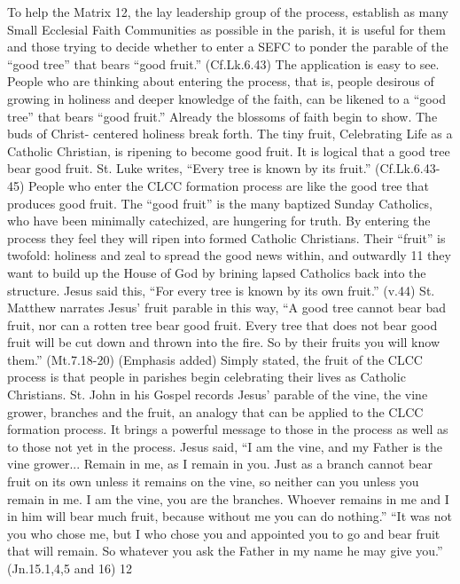 \documentclass{article}        %
\begin{document}
To help the Matrix 12, the lay leadership group of the process, establish as
many Small Ecclesial Faith Communities as possible in the parish, it is useful
for them and those trying to decide whether to enter a SEFC to ponder the
parable of the ``good tree'' that bears ``good fruit.'' (Cf.Lk.6.43) The
application is easy to see. People who are thinking about entering the process,
that is, people desirous of growing in holiness and deeper knowledge of the
faith, can be likened to a ``good tree'' that bears ``good fruit.'' Already the
blossoms of faith begin to show. The buds of Christ- centered holiness break
forth. The tiny fruit, Celebrating Life as a Catholic Christian, is ripening to
become good fruit.
It is logical that a good tree bear good fruit. St. Luke writes, ``Every tree is
known by its fruit.'' (Cf.Lk.6.43-45) People who enter the CLCC formation
process are like the good tree that produces good fruit. The ``good fruit'' is
the many baptized Sunday Catholics, who have been minimally catechized, are
hungering for truth. By entering the process they feel they will ripen into
formed Catholic Christians. Their ``fruit'' is twofold: holiness and zeal to
spread the good news within, and outwardly
11
they want to build up the House of God by brining lapsed Catholics back into the
structure. Jesus said this, ``For every tree is known by its own fruit.'' (v.44)
St. Matthew narrates Jesus' fruit parable in this way, ``A good tree cannot bear
bad fruit, nor can a rotten tree bear good fruit. Every tree that does not bear
good fruit will be cut down and thrown into the fire. So by their fruits you
will know them.'' (Mt.7.18-20) (Emphasis added) Simply stated, the fruit of the
CLCC process is that people in parishes begin celebrating their lives as
Catholic Christians.
St. John in his Gospel records Jesus' parable of the vine, the vine grower,
branches and the fruit, an analogy that can be applied to the CLCC formation
process. It brings a powerful message to those in the process as well as to
those not yet in the process.
Jesus said, ``I am the vine, and my Father is the vine grower... Remain in me,
as I remain in you. Just as a branch cannot bear fruit on its own unless it
remains on the vine, so neither can you unless you remain in me. I am the vine,
you are the branches. Whoever remains in me and I in him will bear much fruit,
because without me you can do nothing.''
``It was not you who chose me, but I who chose you and appointed you to go and
bear fruit that will remain. So whatever you ask the Father in my name he may
give you.'' (Jn.15.1,4,5 and 16)
12
\end{document}
